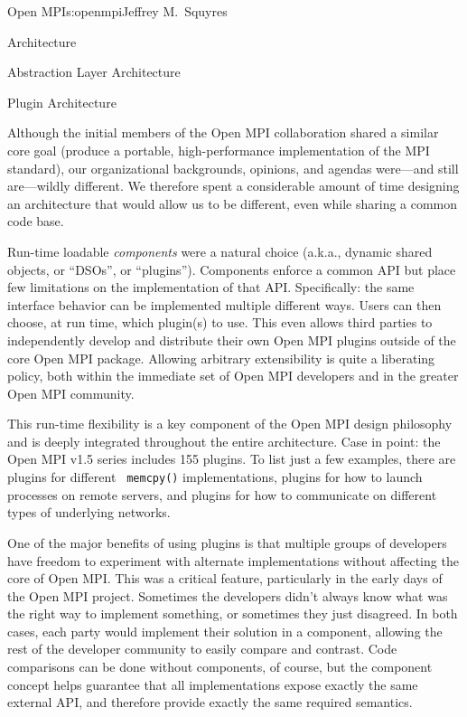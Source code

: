 \begin{aosachapter}{Open MPI}{s:openmpi}{Jeffrey M.\ Squyres}
\begin{aosasect1}{Architecture}
\begin{aosasect2}{Abstraction Layer Architecture}
\end{aosasect2}


\begin{aosasect2}{Plugin Architecture}


Although the initial members of the Open MPI collaboration shared a
similar core goal (produce a portable, high-performance
implementation of the MPI standard), our organizational backgrounds,
opinions, and agendas were---and still are---wildly different.
%
We therefore spent a considerable amount of time designing an
architecture that would allow us to be different, even while sharing
a common code base.

Run-time loadable \emph{components} were a natural choice (a.k.a.,
dynamic shared objects, or ``DSOs'', or ``plugins'').  Components
enforce a common API but place few limitations on the implementation
of that API.
%
Specifically: the same interface behavior can be implemented multiple
different ways.
%
Users can then choose, at run time, which plugin(s) to use.
%
This even allows third parties to independently develop and distribute
their own Open MPI plugins outside of the core Open MPI package.
%
Allowing arbitrary extensibility is quite a liberating policy, both
within the immediate set of Open MPI developers and in the greater
Open MPI community.

This run-time flexibility is a key component of the Open MPI design
philosophy and is deeply integrated throughout the entire
architecture.
%
Case in point: the Open MPI v1.5 series includes 155 plugins.
%
To list just a few examples, there are plugins for different {\tt
  memcpy()} implementations, plugins for how to launch processes on
remote servers, and plugins for how to communicate on different types
of underlying networks.

One of the major benefits of using plugins is that multiple groups of
developers have freedom to experiment with alternate implementations
without affecting the core of Open MPI.
%
This was a critical feature, particularly in the early days of the
Open MPI project.  Sometimes the developers didn't always know what
was the right way to implement something, or sometimes they just
disagreed.
%
In both cases, each party would implement their solution in a
component, allowing the rest of the developer community to easily
compare and contrast. 
%
Code comparisons can be done without components, of course, but the
component concept helps guarantee that all implementations expose
exactly the same external API, and therefore provide exactly the same
required semantics.  


\end{aosasect2}
\end{aosasect1}
\end{aosachapter}
